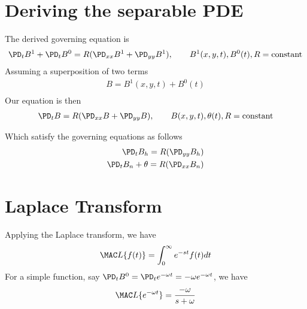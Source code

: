 \documentclass[11pt]{article}
\begin{document}
\MOONSTITLE
\maketitle
\section{Deriving the separable PDE}
The derived governing equation is
\begin{equation}\begin{aligned}
\PD_t B^1 + \PD_t B^0 = R (\PD_{xx} B^1 + \PD_{yy} B^1), \qquad B^1(x,y,t),B^0(t),R=\text{constant} \\
\end{aligned} \end{equation}
Assuming a superposition of two terms
\begin{equation}\begin{aligned}
B = B^1(x,y,t) + B^0(t) \\
\end{aligned} \end{equation}
Our equation is then
\begin{equation}\begin{aligned}
\PD_t B = R (\PD_{xx} B + \PD_{yy} B), \qquad B(x,y,t),\theta(t),R=\text{constant} \\
\end{aligned} \end{equation}

Which satisfy the governing equations as follows
\begin{equation}\begin{aligned}
\PD_t B_h = R (\PD_{yy} B_h) \\
\PD_t B_n + \theta = R (\PD_{xx} B_n) \\
\end{aligned} \end{equation}

\section{Laplace Transform}
Applying the Laplace transform, we have
\begin{equation}\begin{aligned}
\MAC L \{f(t)\} = \int_0^{\infty} e^{-st} f(t) dt \\
\end{aligned} \end{equation}
For a simple function, say $\PD_t B^0 = \PD_t e^{-\omega t} = - \omega e^{-\omega t} $, we have
\begin{equation}\begin{aligned}
\MAC L \{ e^{-\omega t} \} = \frac{- \omega}{s+\omega} \\
\end{aligned} \end{equation}
\end{document}
